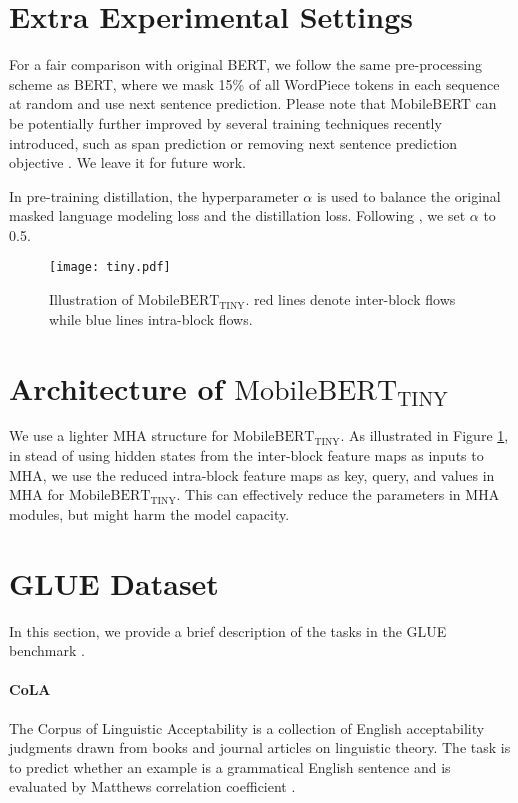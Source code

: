 \documentclass[11pt,a4paper]{article}
\begin{document}
\section{Extra Experimental Settings}

For a fair comparison with original BERT, we follow the same pre-processing scheme as BERT, where we mask 15\% of all WordPiece \citep{kudo2018sentencepiece} tokens in each sequence at random and use next sentence prediction. Please note that MobileBERT can be potentially further improved by several training techniques recently introduced, such as span prediction \citep{joshi2019spanbert} or removing next sentence prediction objective \citep{liu2019roberta}. We leave it for future work.

In pre-training distillation, the hyperparameter $\alpha$ is used to balance the original masked language modeling loss and the distillation loss. Following \citep{kim2016sequence}, we set $\alpha$ to 0.5.

\begin{figure}[t]
	\centering
	\texttt{[image: tiny.pdf]}
	\caption{Illustration of $\text{MobileBERT}_\text{TINY}$.
	\textcolor{myred}{red lines denote {inter-block} flows} while \textcolor{myblue}{{blue lines} {intra-block} flows}.
	}
\label{fig:tiny}
\end{figure}

\section{Architecture of $\text{MobileBERT}_\text{TINY}$}

We use a lighter MHA structure for $\text{MobileBERT}_\text{TINY}$. As illustrated in Figure \ref{fig:tiny}, in stead of using hidden states from the inter-block feature maps as inputs to MHA, we use the reduced intra-block feature maps as key, query, and values in MHA for $\text{MobileBERT}_\text{TINY}$. This can effectively reduce the parameters in MHA modules, but might harm the model capacity.

\section{GLUE Dataset}\label{app:glue}
	
In this section, we provide a brief description of the tasks in the GLUE benchmark \citep{wang2018glue}.

\paragraph{CoLA} The Corpus of Linguistic Acceptability \citep{warstadt2018neural} is a collection of English acceptability judgments drawn from books and journal articles on linguistic theory. The task is to predict whether an example is a grammatical English sentence and is evaluated by Matthews correlation coefficient \citep{matthews1975comparison}.
\end{document}

